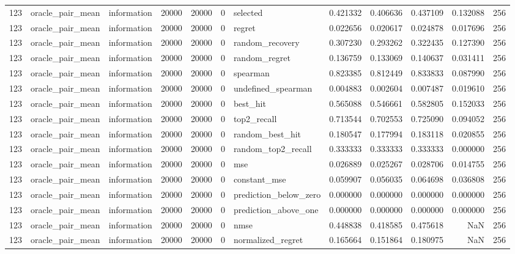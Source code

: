 \begin{tabular}{rllrrrlrrrrr}
123 & oracle_pair_mean & information & 20000 & 20000 & 0 & selected & 0.421332 & 0.406636 & 0.437109 & 0.132088 & 256 \\
123 & oracle_pair_mean & information & 20000 & 20000 & 0 & regret & 0.022656 & 0.020617 & 0.024878 & 0.017696 & 256 \\
123 & oracle_pair_mean & information & 20000 & 20000 & 0 & random_recovery & 0.307230 & 0.293262 & 0.322435 & 0.127390 & 256 \\
123 & oracle_pair_mean & information & 20000 & 20000 & 0 & random_regret & 0.136759 & 0.133069 & 0.140637 & 0.031411 & 256 \\
123 & oracle_pair_mean & information & 20000 & 20000 & 0 & spearman & 0.823385 & 0.812449 & 0.833833 & 0.087990 & 256 \\
123 & oracle_pair_mean & information & 20000 & 20000 & 0 & undefined_spearman & 0.004883 & 0.002604 & 0.007487 & 0.019610 & 256 \\
123 & oracle_pair_mean & information & 20000 & 20000 & 0 & best_hit & 0.565088 & 0.546661 & 0.582805 & 0.152033 & 256 \\
123 & oracle_pair_mean & information & 20000 & 20000 & 0 & top2_recall & 0.713544 & 0.702553 & 0.725090 & 0.094052 & 256 \\
123 & oracle_pair_mean & information & 20000 & 20000 & 0 & random_best_hit & 0.180547 & 0.177994 & 0.183118 & 0.020855 & 256 \\
123 & oracle_pair_mean & information & 20000 & 20000 & 0 & random_top2_recall & 0.333333 & 0.333333 & 0.333333 & 0.000000 & 256 \\
123 & oracle_pair_mean & information & 20000 & 20000 & 0 & mse & 0.026889 & 0.025267 & 0.028706 & 0.014755 & 256 \\
123 & oracle_pair_mean & information & 20000 & 20000 & 0 & constant_mse & 0.059907 & 0.056035 & 0.064698 & 0.036808 & 256 \\
123 & oracle_pair_mean & information & 20000 & 20000 & 0 & prediction_below_zero & 0.000000 & 0.000000 & 0.000000 & 0.000000 & 256 \\
123 & oracle_pair_mean & information & 20000 & 20000 & 0 & prediction_above_one & 0.000000 & 0.000000 & 0.000000 & 0.000000 & 256 \\
123 & oracle_pair_mean & information & 20000 & 20000 & 0 & nmse & 0.448838 & 0.418585 & 0.475618 & NaN & 256 \\
123 & oracle_pair_mean & information & 20000 & 20000 & 0 & normalized_regret & 0.165664 & 0.151864 & 0.180975 & NaN & 256 \\

\end{tabular}
